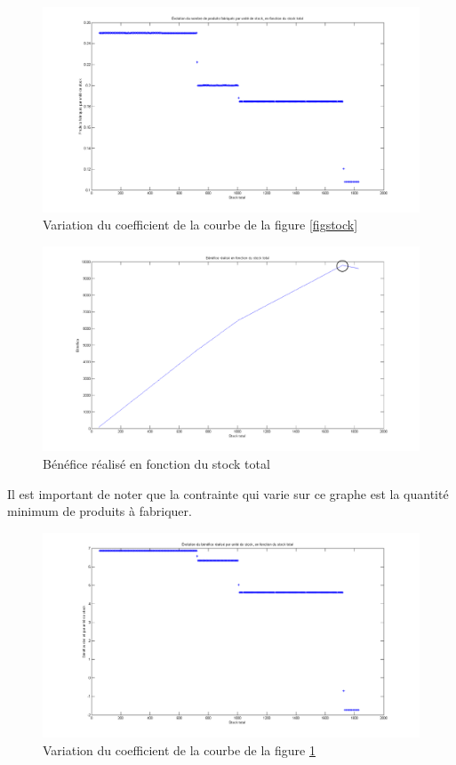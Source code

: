 \documentclass[paper=a4, fontsize=11pt]{report}
\numberwithin{equation}{section}		%
\numberwithin{figure}{section}			%
\numberwithin{table}{section}				%
\begin{document}
\begin{figure}[H]
\centering
\includegraphics[width=16cm]{figures/nbProduitsFctStockTotal_Coeff.png}
\caption{Variation du coefficient de la courbe de la figure \ref{figstock}}
\end{figure}

\begin{figure}[H]
\centering
\includegraphics[width=16cm]{figures/BenefFctStockTotal.png}
\caption{Bénéfice réalisé en fonction du stock total \label{figben}}
\end{figure}

Il est important de noter que la contrainte qui varie sur ce graphe est la quantité minimum de produits à fabriquer.

\begin{figure}[H]
\centering
\includegraphics[width=16cm]{figures/BenefFctStockTotal_Coeff.png}
\caption{Variation du coefficient de la courbe de la figure \ref{figben}}
\end{figure}
\end{document}
